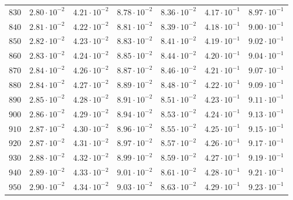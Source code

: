 \begin{table}[h]
\begin{tabular}{lcccccc}
$	830	$ & $	2.80 \cdot 10^{-2}	$ & $	4.21 \cdot 10^{-2}	$ & $	8.78 \cdot 10^{-2}	$ & $	8.36 \cdot 10^{-2}	$ & $	4.17 \cdot 10^{-1}	$ & $	8.97 \cdot 10^{-1}	$ \\
$	840	$ & $	2.81 \cdot 10^{-2}	$ & $	4.22 \cdot 10^{-2}	$ & $	8.81 \cdot 10^{-2}	$ & $	8.39 \cdot 10^{-2}	$ & $	4.18 \cdot 10^{-1}	$ & $	9.00 \cdot 10^{-1}	$ \\
$	850	$ & $	2.82 \cdot 10^{-2}	$ & $	4.23 \cdot 10^{-2}	$ & $	8.83 \cdot 10^{-2}	$ & $	8.41 \cdot 10^{-2}	$ & $	4.19 \cdot 10^{-1}	$ & $	9.02 \cdot 10^{-1}	$ \\
$	860	$ & $	2.83 \cdot 10^{-2}	$ & $	4.24 \cdot 10^{-2}	$ & $	8.85 \cdot 10^{-2}	$ & $	8.44 \cdot 10^{-2}	$ & $	4.20 \cdot 10^{-1}	$ & $	9.04 \cdot 10^{-1}	$ \\
$	870	$ & $	2.84 \cdot 10^{-2}	$ & $	4.26 \cdot 10^{-2}	$ & $	8.87 \cdot 10^{-2}	$ & $	8.46 \cdot 10^{-2}	$ & $	4.21 \cdot 10^{-1}	$ & $	9.07 \cdot 10^{-1}	$ \\
$	880	$ & $	2.84 \cdot 10^{-2}	$ & $	4.27 \cdot 10^{-2}	$ & $	8.89 \cdot 10^{-2}	$ & $	8.48 \cdot 10^{-2}	$ & $	4.22 \cdot 10^{-1}	$ & $	9.09 \cdot 10^{-1}	$ \\
$	890	$ & $	2.85 \cdot 10^{-2}	$ & $	4.28 \cdot 10^{-2}	$ & $	8.91 \cdot 10^{-2}	$ & $	8.51 \cdot 10^{-2}	$ & $	4.23 \cdot 10^{-1}	$ & $	9.11 \cdot 10^{-1}	$ \\
$	900	$ & $	2.86 \cdot 10^{-2}	$ & $	4.29 \cdot 10^{-2}	$ & $	8.94 \cdot 10^{-2}	$ & $	8.53 \cdot 10^{-2}	$ & $	4.24 \cdot 10^{-1}	$ & $	9.13 \cdot 10^{-1}	$ \\
$	910	$ & $	2.87 \cdot 10^{-2}	$ & $	4.30 \cdot 10^{-2}	$ & $	8.96 \cdot 10^{-2}	$ & $	8.55 \cdot 10^{-2}	$ & $	4.25 \cdot 10^{-1}	$ & $	9.15 \cdot 10^{-1}	$ \\
$	920	$ & $	2.87 \cdot 10^{-2}	$ & $	4.31 \cdot 10^{-2}	$ & $	8.97 \cdot 10^{-2}	$ & $	8.57 \cdot 10^{-2}	$ & $	4.26 \cdot 10^{-1}	$ & $	9.17 \cdot 10^{-1}	$ \\
$	930	$ & $	2.88 \cdot 10^{-2}	$ & $	4.32 \cdot 10^{-2}	$ & $	8.99 \cdot 10^{-2}	$ & $	8.59 \cdot 10^{-2}	$ & $	4.27 \cdot 10^{-1}	$ & $	9.19 \cdot 10^{-1}	$ \\
$	940	$ & $	2.89 \cdot 10^{-2}	$ & $	4.33 \cdot 10^{-2}	$ & $	9.01 \cdot 10^{-2}	$ & $	8.61 \cdot 10^{-2}	$ & $	4.28 \cdot 10^{-1}	$ & $	9.21 \cdot 10^{-1}	$ \\
$	950	$ & $	2.90 \cdot 10^{-2}	$ & $	4.34 \cdot 10^{-2}	$ & $	9.03 \cdot 10^{-2}	$ & $	8.63 \cdot 10^{-2}	$ & $	4.29 \cdot 10^{-1}	$ & $	9.23 \cdot 10^{-1}	$ \\

\end{tabular}
\end{table}
